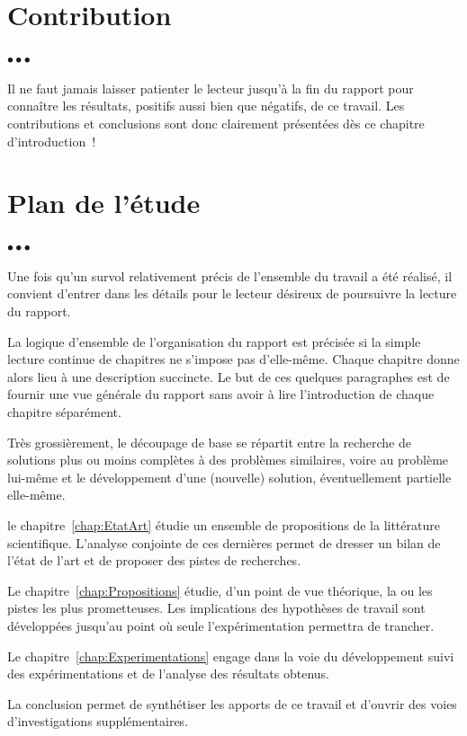 \documentclass[11pt, french, screen, research-development]{report-rd-info}
\newenvironment{explanation}
{\color{blue}
 \begin{list}{}{\hspace{0.2\textwidth}\color{blue}}\item $\bullet\bullet\bullet$
}
{\end{list}}
\begin{document}
\section{Contribution}

\begin{explanation}
   Il ne faut jamais laisser patienter le lecteur jusqu'à la fin du rapport pour connaître les résultats, positifs aussi bien que négatifs, de ce travail.
   Les contributions et conclusions sont donc clairement présentées dès ce chapitre d'introduction~!
\end{explanation}

\section{Plan de l'étude}

\begin{explanation}
   Une fois qu'un survol relativement précis de l'ensemble du travail a été réalisé, il convient d'entrer dans les détails pour le lecteur désireux de poursuivre la lecture du rapport.

   La logique d'ensemble de l'organisation du rapport est précisée si la simple lecture continue de chapitres ne s'impose pas d'elle-même.
   Chaque chapitre donne alors lieu à une description succincte.
   Le but de ces quelques paragraphes est de fournir une vue générale du rapport sans avoir à lire l'introduction de chaque chapitre séparément.

   Très grossièrement, le découpage de base se répartit entre la recherche de solutions plus ou moins complètes à des problèmes similaires, voire au problème lui-même et le développement d'une (nouvelle) solution, éventuellement partielle elle-même.

   le chapitre~\ref{chap:EtatArt} étudie un ensemble de propositions de la littérature scientifique.
   L'analyse conjointe de ces dernières permet de dresser un bilan de l'état de l'art et de proposer des pistes de recherches.

   Le chapitre~\ref{chap:Propositions} étudie, d'un point de vue théorique, la ou les pistes les plus prometteuses.
   Les implications des hypothèses de travail sont développées jusqu'au point où seule l'expérimentation permettra de trancher.

   Le chapitre~\ref{chap:Experimentations} engage dans la voie du développement suivi des expérimentations et de l'analyse des résultats obtenus.

   La conclusion permet de synthétiser les apports de ce travail et d'ouvrir des voies d'investigations supplémentaires.
\end{explanation}
\end{document}
